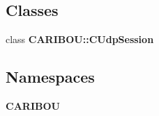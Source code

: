 \subsection*{Classes}
\begin{DoxyCompactItemize}
\item 
class {\bf C\-A\-R\-I\-B\-O\-U\-::\-C\-Udp\-Session}
\end{DoxyCompactItemize}
\subsection*{Namespaces}
\begin{DoxyCompactItemize}
\item 
{\bf C\-A\-R\-I\-B\-O\-U}
\end{DoxyCompactItemize}
